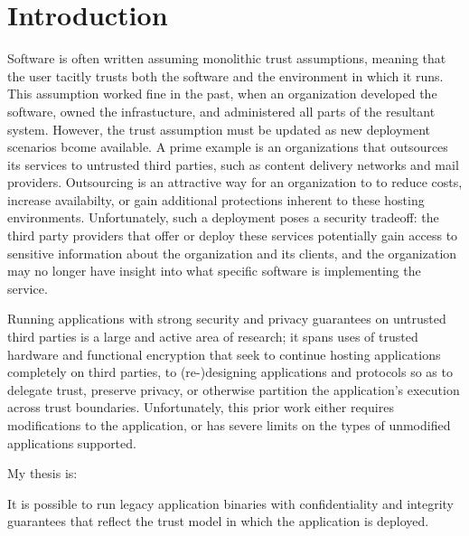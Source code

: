 \section{Introduction}
\label{sec:intro}

Software is often written assuming monolithic trust assumptions, meaning that
the user tacitly trusts both the software and the environment in which it runs.
%
This assumption worked fine in the past, when an organization developed the
software, owned the infrastucture, and administered all parts of the resultant
system.
%
However, the trust assumption must be updated as new deployment scenarios bcome available.
%
A prime example is an organizations that outsources its services to untrusted
third parties, such as content delivery networks and mail providers.
%
Outsourcing is an attractive way for an organization to to reduce costs,
increase availabilty, or gain additional protections inherent to these hosting
environments.
%
Unfortunately, such a deployment poses a security tradeoff: the third party
providers that offer or deploy these services potentially gain access to
sensitive information about the organization and its clients, and the
organization may no longer have insight into what specific software is
implementing the service.


%
Running applications with strong security and privacy guarantees on untrusted
third parties is a large and active area of research; it spans uses of
trusted hardware and functional encryption that seek to continue hosting
applications completely on third parties, to (re-)designing applications and
protocols so as to delegate trust, preserve privacy, or otherwise partition
the application's execution across trust boundaries.
%
Unfortunately, this prior work either requires modifications to the
application, or has severe limits on the types of unmodified applications
supported.


My thesis is:
\begin{displayquote}
    It is possible to run legacy application binaries with confidentiality and
    integrity guarantees that reflect the trust model in which the application
    is deployed.
\end{displayquote}


